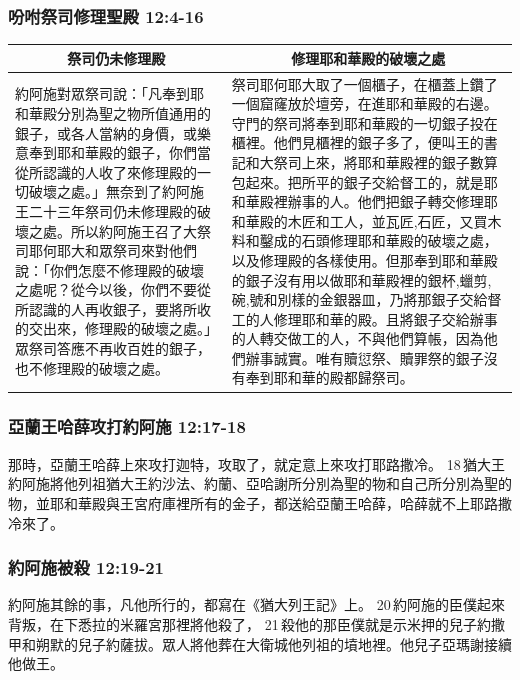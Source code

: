 \subsubsection{吩咐祭司修理聖殿 12:4-16 }
\begin{table}[H]
\hspace{-5mm}
\centering
\begin{tabular}{p{7.25cm}|p{10.5cm}}\hline
\multicolumn{1}{c}{祭司仍未修理殿}&\multicolumn{1}{c}{修理耶和華殿的破壞之處}\\\hline
約阿施對眾祭司說：「凡奉到耶和華殿分別為聖之物所值通用的銀子，或各人當納的身價，或樂意奉到耶和華殿的銀子，你們當從所認識的人收了來修理殿的一切破壞之處。」無奈到了約阿施王二十三年祭司仍未修理殿的破壞之處。所以約阿施王召了大祭司耶何耶大和眾祭司來對他們說：「你們怎麼不修理殿的破壞之處呢？從今以後，你們不要從所認識的人再收銀子，要將所收的交出來，修理殿的破壞之處。」眾祭司答應不再收百姓的銀子，也不修理殿的破壞之處。&祭司耶何耶大取了一個櫃子，在櫃蓋上鑽了一個窟窿放於壇旁，在進耶和華殿的右邊。守門的祭司將奉到耶和華殿的一切銀子投在櫃裡。他們見櫃裡的銀子多了，便叫王的書記和大祭司上來，將耶和華殿裡的銀子數算包起來。把所平的銀子交給督工的，就是耶和華殿裡辦事的人。他們把銀子轉交修理耶和華殿的木匠和工人，並瓦匠,石匠，又買木料和鑿成的石頭修理耶和華殿的破壞之處，以及修理殿的各樣使用。但那奉到耶和華殿的銀子沒有用以做耶和華殿裡的銀杯,蠟剪,碗,號和別樣的金銀器皿，乃將那銀子交給督工的人修理耶和華的殿。且將銀子交給辦事的人轉交做工的人，不與他們算帳，因為他們辦事誠實。唯有贖愆祭、贖罪祭的銀子沒有奉到耶和華的殿都歸祭司。\\\hline
\end{tabular}
\end{table}


\subsubsection{亞蘭王哈薛攻打約阿施 12:17-18 }
那時，亞蘭王哈薛上來攻打迦特，攻取了，就定意上來攻打耶路撒冷。 18 猶大王約阿施將他列祖猶大王約沙法、約蘭、亞哈謝所分別為聖的物和自己所分別為聖的物，並耶和華殿與王宮府庫裡所有的金子，都送給亞蘭王哈薛，哈薛就不上耶路撒冷來了。

\subsubsection{約阿施被殺 12:19-21 }
約阿施其餘的事，凡他所行的，都寫在《猶大列王記》上。 20 約阿施的臣僕起來背叛，在下悉拉的米羅宮那裡將他殺了， 21 殺他的那臣僕就是示米押的兒子約撒甲和朔默的兒子約薩拔。眾人將他葬在大衛城他列祖的墳地裡。他兒子亞瑪謝接續他做王。


